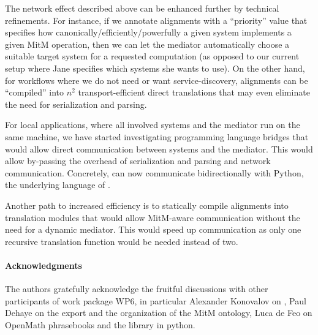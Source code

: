 The network effect described above can be enhanced further by technical refinements.
For instance, if we annotate alignments with a ``priority'' value that specifies how canonically/efficiently/powerfully a given system implements a given MitM operation, then we can let the \MMT mediator automatically choose a suitable target system for a requested computation (as opposed to our current setup where Jane specifies which systems she wants to use).
On the other hand, for workflows where we do not need or want service-discovery, alignments can be ``compiled'' into $n^2$ transport-efficient direct translations that may even eliminate the need for serialization and parsing.

For local applications, where all involved systems and the mediator run on the same machine, we have started investigating programming language bridges that would allow direct communication between systems and the \MMT mediator.
This would allow by-passing the overhead of serialization and parsing and network communication.
Concretely, \MMT can now communicate bidirectionally with Python, the underlying language of \Sage.

Another path to increased efficiency is to statically compile alignments into translation modules that would allow MitM-aware communication without the need for a dynamic mediator.
This would speed up communication as only one recursive translation function would be needed instead of two.

\paragraph*{Acknowledgments}
The authors gratefully acknowledge the fruitful discussions with other participants of
work package WP6, in particular Alexander Konovalov on \SCSCP, Paul Dehaye on the \Sage
export and the organization of the MitM ontology, Luca de Feo on OpenMath phrasebooks
and the \SCSCP library in python.



